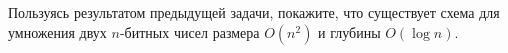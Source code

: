 Пользуясь результатом предыдущей задачи, покажите, что существует схема для умножения двух $n$-битных чисел размера $O(n^2)$
и глубины $O(\log n)$.